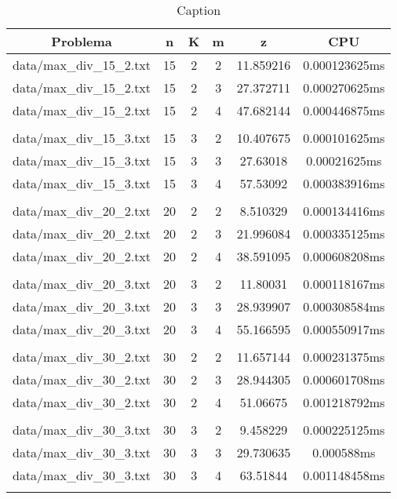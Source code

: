 \begin{table}[h]
\centering
\begin{tabular}{|c|c|c|c|c|c|}
\hline
Problema &  n &  K &  m &  z &  CPU \\
\hline
data/max\_div\_15\_2.txt &  15 &  2 &  2 &  11.859216 &  0.000123625ms \\
data/max\_div\_15\_2.txt &  15 &  2 &  3 &  27.372711 &  0.000270625ms \\
data/max\_div\_15\_2.txt &  15 &  2 &  4 &  47.682144 &  0.000446875ms \\
 \\
data/max\_div\_15\_3.txt &  15 &  3 &  2 &  10.407675 &  0.000101625ms \\
data/max\_div\_15\_3.txt &  15 &  3 &  3 &  27.63018 &  0.00021625ms \\
data/max\_div\_15\_3.txt &  15 &  3 &  4 &  57.53092 &  0.000383916ms \\
 \\
data/max\_div\_20\_2.txt &  20 &  2 &  2 &  8.510329 &  0.000134416ms \\
data/max\_div\_20\_2.txt &  20 &  2 &  3 &  21.996084 &  0.000335125ms \\
data/max\_div\_20\_2.txt &  20 &  2 &  4 &  38.591095 &  0.000608208ms \\
 \\
data/max\_div\_20\_3.txt &  20 &  3 &  2 &  11.80031 &  0.000118167ms \\
data/max\_div\_20\_3.txt &  20 &  3 &  3 &  28.939907 &  0.000308584ms \\
data/max\_div\_20\_3.txt &  20 &  3 &  4 &  55.166595 &  0.000550917ms \\
 \\
data/max\_div\_30\_2.txt &  30 &  2 &  2 &  11.657144 &  0.000231375ms \\
data/max\_div\_30\_2.txt &  30 &  2 &  3 &  28.944305 &  0.000601708ms \\
data/max\_div\_30\_2.txt &  30 &  2 &  4 &  51.06675 &  0.001218792ms \\
 \\
data/max\_div\_30\_3.txt &  30 &  3 &  2 &  9.458229 &  0.000225125ms \\
data/max\_div\_30\_3.txt &  30 &  3 &  3 &  29.730635 &  0.000588ms \\
data/max\_div\_30\_3.txt &  30 &  3 &  4 &  63.51844 &  0.001148458ms \\
 \\
\hline
\end{tabular}
\caption{Caption}
\label{tab:my_table}
\end{table}